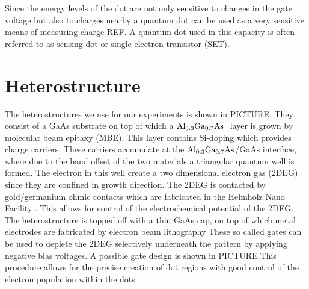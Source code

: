 Since the energy levels of the dot are not only sensitive to changes in the gate voltage but also to charges nearby a quantum dot can be used as a very sensitive means of measuring charge REF. A quantum dot used in this capacity is often referred to as sensing dot or single electron transistor (SET). 

\begin{figure}[htbp] 
  \centering
  \caption{}
  \label{fig:quantumdots}
\end{figure}

 
\section{Heterostructure}
The heterostructures we use for our experiments is shown in PICTURE. They consist of a GaAs substrate on top of which a $\mathrm{Al_{0.3}Ga_{0.7}As} \ $ layer is grown by molecular beam epitaxy (MBE). This layer contains Si-doping which provides charge carriers. These carriers accumulate at the $\mathrm{Al_{0.3}Ga_{0.7}As}$/GaAs interface, where due to the band offset of the two materials a triangular quantum well is formed. The electron in this well create a two dimensional electron gas (2DEG) since they are confined in growth direction. 
The 2DEG is contacted by gold/germanium ohmic contacts which are fabricated in the Helmholz Nano Facility \cite{HNF}. This allows for control of the electrochemical potential of the 2DEG.
The heterostructure is topped off with a thin GaAs cap, on top of which metal electrodes are fabricated by electron beam lithography
These so called gates can be used to deplete the 2DEG selectively underneath the pattern by applying negative bias voltages. A possible gate design is shown in PICTURE.This procedure allows for the precise creation of dot regions with good control of the electron population within the dots.

